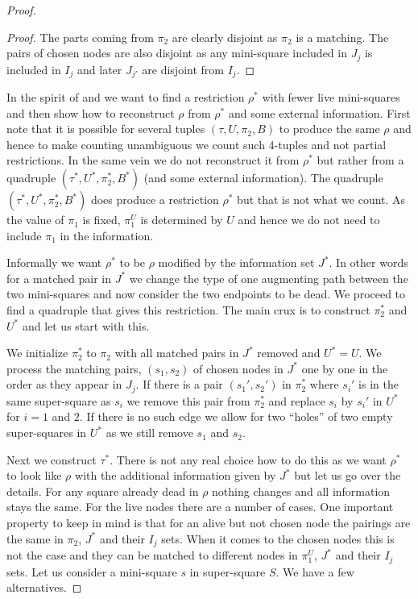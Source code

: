 \documentclass{theoretics}
\begin{document}
\begin{proof}
\begin{proof}
The parts coming from $\pi_2$ are clearly disjoint
as $\pi_2$ is a matching.  The pairs of chosen nodes
are also disjoint as any mini-square included in $J_j$
is included in $I_j$ and later $J_{j'}$ are disjoint
from $I_j$.
\end{proof}

In the spirit of \cite{jhtseitin} and \cite{jhkr} we want to find a restriction
$\rho^*$ with fewer live mini-squares and then show how to
reconstruct $\rho$ from $\rho^*$ and some external information.
First note that it is possible for several tuples $(\tau, U, \pi_2, B)$
to produce the same $\rho$ and hence to make counting unambiguous we
count such 4-tuples and not partial restrictions.  In the same vein
we do not reconstruct it from $\rho^*$ but rather from a
quadruple $(\tau^*, U^*, \pi_2^*, B^*)$ (and some external information).
The quadruple 
$(\tau^*, U^*, \pi_2^*, B^*)$ does produce a restriction $\rho^*$ but
that is not what we count.  As the value of $\pi_1$ is fixed,
$\pi_1^U$ is determined by $U$ and hence we do not need to include
$\pi_1$ in the information.

Informally we 
want $\rho^*$ to be $\rho$ modified by the information set $J^*$.
In other words for a matched pair in $J^*$ we change the type of one augmenting
path between the two mini-squares and now consider the two
endpoints to be dead.  We proceed to find a quadruple that
gives this restriction.  The main crux is to construct $\pi_2^*$
and $U^*$ and let us start with this.

We initialize $\pi_2^*$ to  $\pi_2$ with all matched pairs in $J^*$ 
removed and $U^*=U$.  
We process the matching pairs, $(s_1,s_2)$ of chosen nodes
in $J^*$ one by one in the order as they appear in $J_j$.
If there is a pair $(s_1', s_2')$
in $\pi_2^*$ where $s_i'$ is in the same super-square as $s_i$ we remove
this pair from $\pi_2^*$ and replace $s_i$ by $s_i'$ in $U^*$ for $i=1$ and
$2$.  If there is no such edge we allow for two ``holes'' of
two empty super-squares in $U^*$ as we still remove $s_1$ and $s_2$.

Next we construct $\tau^*$.  There is not any real choice
how to do this as we want $\rho^*$ to look like $\rho$ with the
additional information given by $J^*$ but let us go over the 
details.   For any square already dead in $\rho$ nothing changes
and all information stays the same.  For the live nodes
there are a number of cases.  One important property
to keep in mind is that for an alive but not chosen
node the pairings are the same in $\pi_2$, $J^*$ and their
$I_j$ sets. When it comes to the chosen nodes this is not the case
and they can be matched to different nodes in $\pi_1^U$,
$J^*$ and their $I_j$ sets.
Let us consider a mini-square $s$ in super-square $S$.
We have a few alternatives.


\end{proof}
\end{document}
